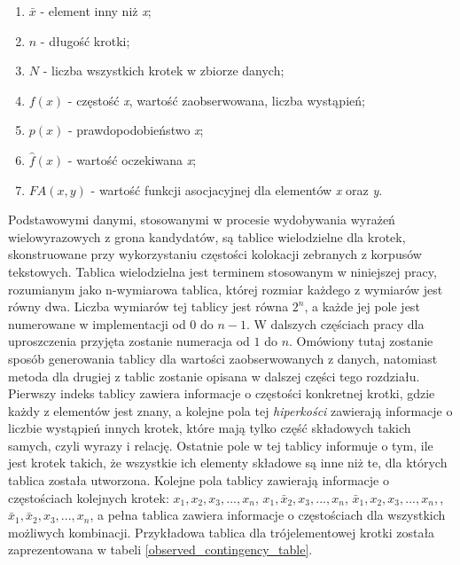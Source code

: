 \begin{enumerate}
	\item \( \bar{x} \) - element inny niż \emph{x};
	\item \( n \) - długość krotki;
	\item \( N \) - liczba wszystkich krotek w zbiorze danych;
	\item \( f(x) \) - częstość \emph{x}, wartość zaobserwowana, liczba wystąpień;
	\item \( p(x) \) - prawdopodobieństwo \emph{x};
	\item \( \hat{f}(x) \) - wartość oczekiwana \emph{x};
	\item \( FA(x, y) \) - wartość funkcji asocjacyjnej dla elementów \emph{x} oraz \emph{y}.
\end{enumerate}

\par
Podstawowymi danymi, stosowanymi w procesie wydobywania wyrażeń wielowyrazowych z grona kandydatów, są tablice wielodzielne dla krotek, skonstruowane przy wykorzystaniu częstości kolokacji zebranych z korpusów tekstowych.
Tablica wielodzielna jest terminem stosowanym w niniejszej pracy, rozumianym jako n-wymiarowa tablica, której rozmiar każdego z wymiarów jest równy dwa.
Liczba wymiarów tej tablicy jest równa $ 2^{n} $, a każde jej pole jest numerowane w implementacji od $ 0 $ do $ n - 1 $.
W dalszych częściach pracy dla uproszczenia przyjęta zostanie numeracja od $ 1 $ do $ n $.
Omówiony tutaj zostanie sposób generowania tablicy dla wartości zaobserwowanych z danych, natomiast metoda dla drugiej z tablic zostanie opisana w dalszej części tego rozdziału.
Pierwszy indeks tablicy zawiera informacje o częstości konkretnej krotki, gdzie każdy z elementów jest znany, a kolejne pola tej \emph{hiperkości} zawierają informacje o liczbie wystąpień innych krotek, które mają tylko część składowych takich samych, czyli wyrazy i relację.
Ostatnie pole w tej tablicy informuje o tym, ile jest krotek takich, że wszystkie ich elementy składowe są inne niż te, dla których tablica została utworzona.
Kolejne pola tablicy zawierają informacje o częstościach kolejnych krotek: $ x_{1}, x_{2}, x_{3}, ..., x_{n} $, $ x_{1}, \bar{x}_{2}, x_{3}, ..., x_{n} $, $ \bar{x}_{1}, x_{2}, x_{3}, ..., x_{n}, $, $ \bar{x}_{1}, \bar{x}_{2}, x_{3}, ..., x_{n} $, a pełna tablica zawiera informacje o częstościach dla wszystkich możliwych kombinacji.
Przykładowa tablica dla trójelementowej krotki została zaprezentowana w tabeli \ref{observed_contingency_table}.

